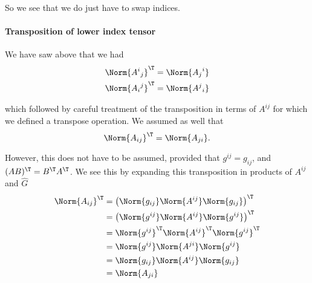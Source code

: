 So we see that we do just have to swap indices.

%
%
%
%
%
\paragraph{Transposition of lower index tensor}
%
We have saw above that we had
%
\begin{equation}\label{eqn:relativisticElectrodynamicsL11:1022}
\begin{aligned}
\Norm{ {A^{i}}_j }^\T &= \Norm{ {A_{j}}^i } \\
\Norm{ {A_{i}}^j }^\T &= \Norm{ {A^{j}}_i }
\end{aligned}
\end{equation}

which followed by careful treatment of the transposition in terms of \(A^{i j}\) for which we defined a transpose operation.  We assumed as well that
%
\begin{equation}\label{eqn:relativisticElectrodynamicsL11:1042}
\Norm{ A_{i j} }^\T = \Norm{ A_{j i} }.
\end{equation}

However, this does not have to be assumed, provided that \(g^{i j} = g_{i j}\), and \((AB)^\T = B^\T A^\T\).  We see this by expanding this transposition in products of \(A^{i j}\) and \(\hat{G}\)
%
\begin{equation}\label{eqn:relativisticElectrodynamicsL11b:1480}
\begin{aligned}
\Norm{ A_{i j} }^\T
&= \left( \Norm{g_{i j}} \Norm{ A^{i j} } \Norm{g_{i j}} \right)^\T \\
&= \left( \Norm{g^{i j}} \Norm{ A^{i j} } \Norm{g^{i j}} \right)^\T \\
&= \Norm{g^{i j}}^\T \Norm{ A^{i j}}^\T \Norm{g^{i j}}^\T \\
&= \Norm{g^{i j}} \Norm{ A^{j i}} \Norm{g^{i j}} \\
&= \Norm{g_{i j}} \Norm{ A^{i j}} \Norm{g_{i j}} \\
&= \Norm{ A_{j i}}
\end{aligned}
\end{equation}

